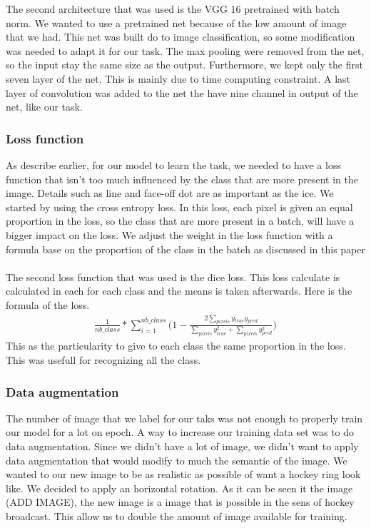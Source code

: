 The second architecture that was used is the VGG 16 pretrained with batch norm. We wanted to use a pretrained net because of the low amount of image that we had. This net was built do to image classification, so some modification was needed to adapt it for our task. The max pooling were removed from the net, so the input stay the same size as the output. Furthermore, we kept only the first seven layer of the net. This is mainly due to time computing constraint. A last layer of convolution was added to the net the have nine channel in output of the net, like our task. 

\subsubsection{Loss function}
As describe earlier, for our model to learn the task, we needed to have a loss function that isn't too much influenced by the class that are more present in the image. Details such as line and face-off dot are as important as the ice. We started by using the cross entropy loss. In this loss, each pixel is given an equal proportion in the loss, so the class that are more present in a batch, will have a bigger impact on the loss. We adjust the weight in the loss function with a formula base on the proportion of the class in the batch as discussed in this paper  \cite{Paszke}
\\
\\
The second loss function that was used is the dice loss. This loss calculate is calculated in each for each class and the means is taken afterwards. Here is the formula of the loss.
\begin{gather*}
 \frac{1}{nb\_class}*\sum\limits_{i=1}^{nb\_class}\Big(1-\frac{2\sum\limits_{pixels}y_{true}y_{pred}}{\sum\limits_{pixels}y_{true}^{2}+\sum\limits_{pixels}y_{pred}^{2}}\Big)
\end{gather*}
This as the particularity to give to each class the same proportion in the loss. This was usefull for recognizing all the class.

\subsubsection{Data augmentation}
The number of image that we label for our taks was not enough to properly train our model for a lot on epoch. A way to increase our training data set was to do data augmentation. Since we didn't have a lot of image, we didn't want to apply data augmentation that would modify to much the semantic of the image. We wanted to 
our new image to be as realistic as possible of want a hockey ring look like. We decided to apply an horizontal rotation. As it can be seen it the image (ADD IMAGE), the new image is a image that is possible in the sens of hockey broadcast. This allow us to double the amount of image available for training. 

